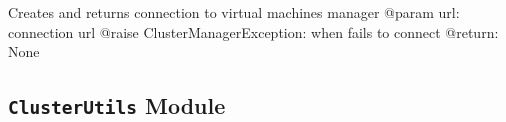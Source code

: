 \documentclass[letterpaper,10pt,english]{sphinxmanual}
\begin{document}
\begin{fulllineitems}
\begin{fulllineitems}
\end{fulllineitems}


\begin{fulllineitems}
\label{ref-manual/XrdTest:XrdTest.ClusterManager.ClusterManager.virtconnect}
Creates and returns connection to virtual machines manager
@param url: connection url
@raise ClusterManagerException: when fails to connect
@return: None

\end{fulllineitems}


\end{fulllineitems}



\subsection{\texttt{ClusterUtils} Module}
\label{ref-manual/XrdTest:clusterutils-module}\label{ref-manual/XrdTest:module-XrdTest.ClusterUtils}
\end{document}
